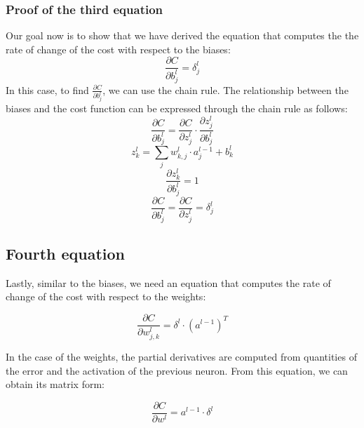 \documentclass[../main]{subfiles}
\begin{document}
\subsubsection{Proof of the third equation}
Our goal now is to show that we have derived the equation that computes the the rate of change of the cost with respect to the biases:
\begin{equation*}
    \frac{\partial C}{\partial b_{j}^l} = \delta_{j}^l
\end{equation*}
In this case, to find $\frac{\partial C}{\partial b_{j}^l}$, we can use the chain rule. The relationship between the biases and the cost function can be expressed through the chain rule as follows:
\begin{equation*}
    \frac{\partial C}{\partial b_{j}^l} = \frac{\partial C}{\partial z_{j}^l}\cdot\frac{\partial z_{j}^l}{\partial b_{j}^l}
\end{equation*}
\begin{equation*}
    z_{k}^{l} = \sum_j w_{k,j}^{l} \cdot a_{j}^{l-1} + b_{k}^{l} 
\end{equation*}
\begin{equation*}
    \frac{\partial z_{k}^{l}}{\partial b_{j}^l} = 1
\end{equation*}
\begin{equation*}
    \frac{\partial C}{\partial b_{j}^l} = \frac{\partial C}{\partial z_{j}^l}=\delta_{j}^l
\end{equation*}
\subsection{Fourth equation}
Lastly, similar to the biases, we need an equation that computes the rate of change of the cost with respect to the weights:\vspace{6mm}
\begin{mdframed}[style=myequationstyle]
\begin{equation*}
    \frac{\partial C}{\partial w_{j,k}^l} = \delta^l \cdot (a^{l-1})^T
\end{equation*}
\end{mdframed}\vspace{4mm}
In the case of the weights, the partial derivatives are computed from quantities of the error and the activation of the previous neuron. From this equation, we can obtain its matrix form:\vspace{6mm}
\begin{mdframed}[style=myequationstyle]
\begin{equation*}
    \frac{\partial C}{\partial w^l} = a^{l-1} \cdot \delta^l
\end{equation*}
\end{mdframed}
\end{document}
